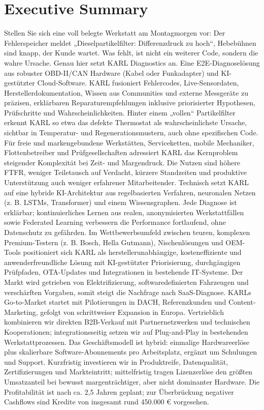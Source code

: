 \section{Executive Summary}
Stellen Sie sich eine voll belegte Werkstatt am Montagmorgen vor: Der Fehlerspeicher meldet „Dieselpartikelfilter: Differenzdruck zu hoch“, Hebebühnen sind knapp, der Kunde wartet. Was fehlt, ist nicht ein weiterer Code, sondern die wahre Ursache. Genau hier setzt \ac{KARL} Diagnostics an. Eine \ac{E2E}-Diagnoselösung aus robuster \ac{OBD}-II/\ac{CAN} Hardware (Kabel oder Funkadapter) und \ac{KI}-gestützter Cloud-Software. KARL fusioniert Fehlercodes, Live-Sensordaten, Herstellerdokumentation, Wissen aus Communities und externe Messgeräte zu präzisen, erklärbaren Reparaturempfehlungen inklusive priorisierter Hypothesen, Prüfschritte und Wahrscheinlichkeiten. Hinter einem „vollen“ Partikelfilter erkennt \ac{KARL} so etwa das defekte Thermostat als wahrscheinlichste Ursache, sichtbar in Temperatur- und Regenerationsmustern, auch ohne spezifischen Code.
\newline\newline
Für freie und markengebundene Werkstätten, Serviceketten, mobile Mechaniker, Flottenbetreiber und Prüfgesellschaften adressiert \ac{KARL} das Kernproblem steigender Komplexität bei Zeit- und Margendruck. Die Nutzen sind höhere \ac{FTFR}, weniger Teiletausch auf Verdacht, kürzere Standzeiten und produktive Unterstützung auch weniger erfahrener Mitarbeitender. Technisch setzt KARL auf eine hybride KI-Architektur aus regelbasierten Verfahren, neuronalen Netzen (z. B. LSTMs, Transformer) und einem Wissensgraphen. Jede Diagnose ist erklärbar; kontinuierliches Lernen aus realen, anonymisierten Werkstattfällen sowie Federated Learning verbessern die Performance fortlaufend, ohne Datenschutz zu gefährden. Im Wettbewerbsumfeld zwischen teuren, komplexen Premium-Testern (z. B. Bosch, Hella Gutmann), Nischenlösungen und \ac{OEM}-Tools positioniert sich KARL als herstellerunabhängige, kosteneffiziente und anwenderfreundliche Lösung mit \ac{KI}-gestützter Priorisierung, durchgängigen Prüfpfaden, \ac{OTA}-Updates und Integrationen in bestehende IT-Systeme.
\newline\newline
Der Markt wird getrieben von Elektrifizierung, softwaredefinierten Fahrzeugen und verschärften Vorgaben, somit steigt die Nachfrage nach \ac{SaaS}-Diagnose. \ac{KARL}s Go-to-Market startet mit Pilotierungen in DACH, Referenzkunden und Content-Marketing, gefolgt von schrittweiser Expansion in Europa. Vertrieblich kombinieren wir direkten \ac{B2B}-Verkauf mit Partnernetzwerken und technischen Kooperationen; integrationsseitig setzen wir auf Plug-and-Play in bestehenden Werkstattprozessen. Das Geschäftsmodell ist hybrid: einmalige Hardwareerlöse plus skalierbare Software-Abonnements pro Arbeitsplatz, ergänzt um Schulungen und Support. Kurzfristig investieren wir in Produktreife, Datenqualität, Zertifizierungen und Markteintritt; mittelfristig tragen Lizenzerlöse den größten Umsatzanteil bei bewusst margenträchtiger, aber nicht dominanter Hardware. Die Profitabilität ist nach ca. 2,5 Jahren geplant; zur Überbrückung negativer Cashflows sind Kredite von insgesamt rund 450.000 € vorgesehen.
